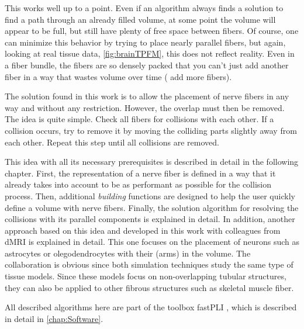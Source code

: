 This works well up to a point.
Even if an algorithm always finds a solution to find a path through an already filled volume, at some point the volume will appear to be full, but still have plenty of free space between fibers.
Of course, one can minimize this behavior by trying to place nearly parallel fibers, but again, looking at real tissue data, \eg{} \cref{fig:brainTPFM}, this does not reflect reality.
Even in a fiber bundle, the fibers are so densely packed that you can't just add another fiber in a way that wastes volume over time (\ie{} add more fibers).
\par
%
The solution found in this work is to allow the placement of nerve fibers in any way and without any restriction.
However, the overlap must then be removed.
The idea is quite simple.
Check all fibers for collisions with each other.
If a collision occurs, try to remove it by moving the colliding parts slightly away from each other.
Repeat this step until all collisions are removed.
\par
%
This idea \cite{Matuschke2019} with all its necessary prerequisites is described in detail in the following chapter.
First, the representation of a nerve fiber is defined in a way that it already takes into account to be as performant as possible for the collision process.
Then, additional \textit{building} functions are designed to help the user quickly define a volume with nerve fibers.
Finally, the solution algorithm for resolving the collisions with its parallel components is explained in detail.
In addition, another approach based on this idea and developed in this work with colleagues from \ac{dMRI} is explained in detail.
This one focuses on the placement of neurons such as astrocytes or olegodendrocytes with their (arms) in the volume.
The collaboration is obvious since both simulation techniques study the same type of tissue models.
Since these models focus on non-overlapping tubular structures, they can also be applied to other fibrous structures such as skeletal muscle fiber.
\par
%
All described algorithms here are part of the toolbox \ac{fastPLI} \cite{Matuschke2019, Matuschke2021}, which is described in detail in \cref{chap:Software}.
%
%
%
